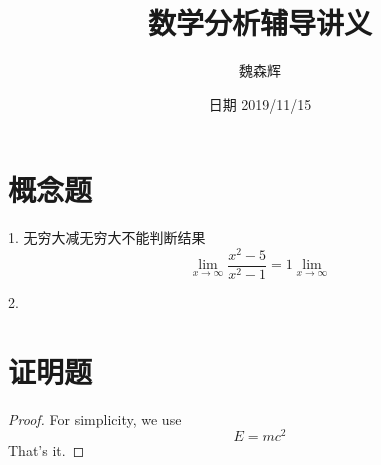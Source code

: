 \documentclass[12pt, a4paper]{ctexart}
\title{数学分析辅导讲义}
\date{日期 2019/11/15}
\author{魏森辉}
\begin{document}
\maketitle{}
\section{概念题}
		1. 无穷大减无穷大不能判断结果
	\[
 \lim _{x \rightarrow \infty} \frac{x^{2}-5}{x^{2}-1}=1
\lim _{x \rightarrow \infty} 
\]

2.

\section{证明题}
\begin{proof}
For simplicity, we use
\[
E=mc^2
\]
That's it.
\end{proof}
\end{document}
